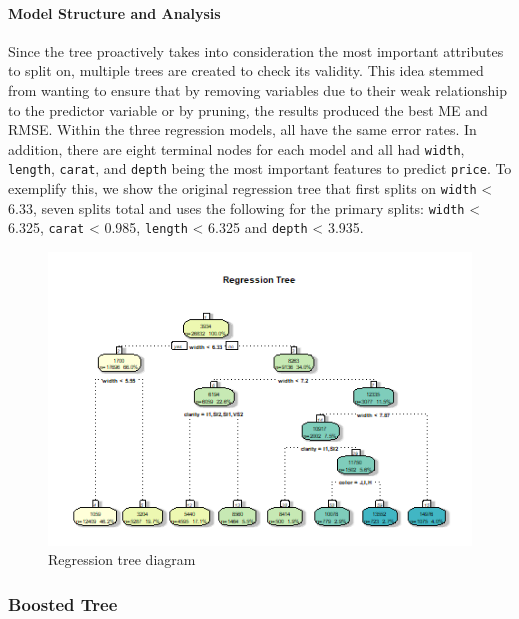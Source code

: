 \documentclass[
  paper=a4,
  ,captions=tableheading
]{scrartcl}
\begin{document}
\hypertarget{model-structure-and-analysis}{%
\paragraph{Model Structure and
Analysis}\label{model-structure-and-analysis}}

Since the tree proactively takes into consideration the most important
attributes to split on, multiple trees are created to check its
validity. This idea stemmed from wanting to ensure that by removing
variables due to their weak relationship to the predictor variable or by
pruning, the results produced the best ME and RMSE. Within the three
regression models, all have the same error rates. In addition, there are
eight terminal nodes for each model and all had \texttt{width},
\texttt{length}, \texttt{carat}, and \texttt{depth} being the most
important features to predict \texttt{price}. To exemplify this, we show
the original regression tree that first splits on \texttt{width}
\textless{} 6.33, seven splits total and uses the following for the
primary splits: \texttt{width} \textless{} 6.325, \texttt{carat}
\textless{} 0.985, \texttt{length} \textless{} 6.325 and \texttt{depth}
\textless{} 3.935.

\begin{figure}[H]

{\centering \includegraphics[width=\linewidth,]{Diamonds_PDF_files/figure-latex/Default Regression Tree-1}

}

\caption{Regression tree diagram}\label{fig:Default Regression Tree}
\end{figure}

\hypertarget{boosted-tree}{%
\subsubsection{Boosted Tree}\label{boosted-tree}}
\end{document}
